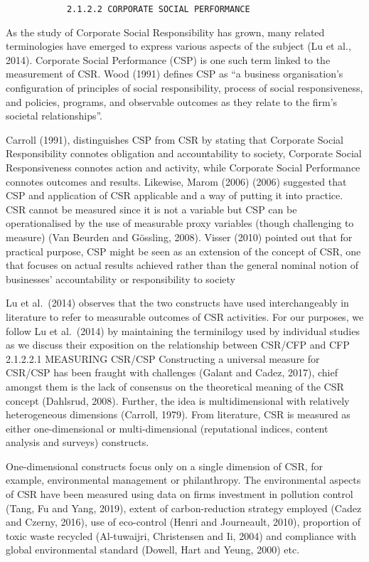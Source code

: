 \documentclass[
]{mitthesis}
\begin{document}
\begin{verbatim}
            2.1.2.2 CORPORATE SOCIAL PERFORMANCE
\end{verbatim}

As the study of Corporate Social Responsibility has grown, many related terminologies have emerged to express various aspects of the subject (Lu et al., 2014). Corporate Social Performance (CSP) is one such term linked to the measurement of CSR. Wood (1991) defines CSP as ``a business organisation's configuration of principles of social responsibility, process of social responsiveness, and policies, programs, and observable outcomes as they relate to the firm's societal relationships''.

Carroll (1991), distinguishes CSP from CSR by stating that Corporate Social Responsibility connotes obligation and accountability to society, Corporate Social Responsiveness connotes action and activity, while Corporate Social Performance connotes outcomes and results. Likewise, Marom (2006) (2006) suggested that CSP and application of CSR applicable and a way of putting it into practice. CSR cannot be measured since it is not a variable but CSP can be operationalised by the use of measurable proxy variables (though challenging to measure) (Van Beurden and Gössling, 2008). Visser (2010) pointed out that for practical purpose, CSP might be seen as an extension of the concept of CSR, one that focuses on actual results achieved rather than the general nominal notion of businesses' accountability or responsibility to society

Lu et al.~(2014) observes that the two constructs have used interchangeably in literature to refer to measurable outcomes of CSR activities. For our purposes, we follow Lu et al.~(2014) by maintaining the terminilogy used by individual studies as we discuss their exposition on the relationship between CSR/CFP and CFP
2.1.2.2.1 MEASURING CSR/CSP
Constructing a universal measure for CSR/CSP has been fraught with challenges (Galant and Cadez, 2017), chief amongst them is the lack of consensus on the theoretical meaning of the CSR concept (Dahlsrud, 2008). Further, the idea is multidimensional with relatively heterogeneous dimensions (Carroll, 1979). From literature, CSR is measured as either one-dimensional or multi-dimensional (reputational indices, content analysis and surveys) constructs.

One-dimensional constructs focus only on a single dimension of CSR, for example, environmental management or philanthropy. The environmental aspects of CSR have been measured using data on firms investment in pollution control (Tang, Fu and Yang, 2019), extent of carbon-reduction strategy employed (Cadez and Czerny, 2016), use of eco-control (Henri and Journeault, 2010), proportion of toxic waste recycled (Al-tuwaijri, Christensen and Ii, 2004) and compliance with global environmental standard (Dowell, Hart and Yeung, 2000) etc.
\end{document}
